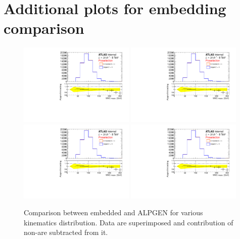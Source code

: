 \clearpage

\section{Additional plots for embedding comparison}
\label{appendix:additionalEmb}

\begin{figure}[htp]
     \begin{center}

           \includegraphics[page=4, width=0.49\textwidth]{figure/bg_estimation/std_plots_emb.pdf}
            \includegraphics[page=4, width=0.49\textwidth]{figure/bg_estimation/std_plots_emb.pdf}
            \includegraphics[page=5, width=0.49\textwidth]{figure/bg_estimation/std_plots_emb.pdf}
            \includegraphics[page=6, width=0.49\textwidth]{figure/bg_estimation/std_plots_emb.pdf}

    \end{center}
    \caption{Comparison between embedded \Ztautau and ALPGEN for various kinematics distribution.
	Data are superimposed and contribution of non-\Ztautau are subtracted from it.}
\end{figure}


